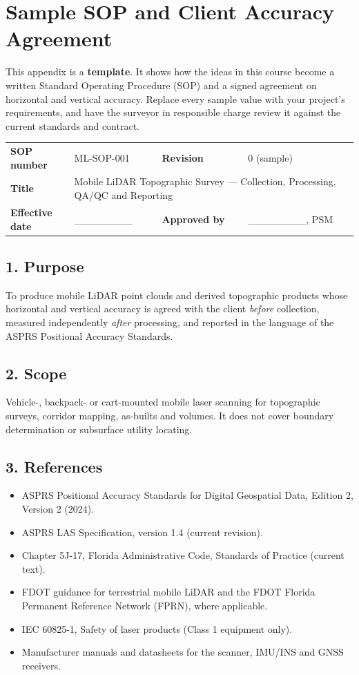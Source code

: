 \chapter{Sample SOP and Client Accuracy Agreement}
This appendix is a \textbf{template}. It shows how the ideas in this course become a written Standard Operating Procedure (SOP) and a signed agreement on horizontal and vertical accuracy. Replace every sample value with your project's requirements, and have the surveyor in responsible charge review it against the current standards and contract.

\begin{center}\small
\renewcommand{\arraystretch}{1.25}
\begin{tabularx}{\linewidth}{>{\bfseries}p{3.4cm}X>{\bfseries}p{2.6cm}X}\toprule
SOP number & ML-SOP-001 & Revision & 0 (sample)\\
Title & \multicolumn{3}{p{10.5cm}}{Mobile LiDAR Topographic Survey --- Collection, Processing, QA/QC and Reporting}\\
Effective date & \_\_\_\_\_\_\_\_ & Approved by & \_\_\_\_\_\_\_\_, PSM\\\bottomrule
\end{tabularx}\end{center}

\section*{1. Purpose}
To produce mobile LiDAR point clouds and derived topographic products whose horizontal and vertical accuracy is agreed with the client \emph{before} collection, measured independently \emph{after} processing, and reported in the language of the ASPRS Positional Accuracy Standards.

\section*{2. Scope}
Vehicle-, backpack- or cart-mounted mobile laser scanning for topographic surveys, corridor mapping, as-builts and volumes. It does not cover boundary determination or subsurface utility locating.

\section*{3. References}
\begin{itemize}
\item ASPRS Positional Accuracy Standards for Digital Geospatial Data, Edition 2, Version 2 (2024).
\item ASPRS LAS Specification, version 1.4 (current revision).
\item Chapter 5J-17, Florida Administrative Code, Standards of Practice (current text).
\item FDOT guidance for terrestrial mobile LiDAR and the FDOT Florida Permanent Reference Network (FPRN), where applicable.
\item IEC 60825-1, Safety of laser products (Class 1 equipment only).
\item Manufacturer manuals and datasheets for the scanner, IMU/INS and GNSS receivers.
\end{itemize}

